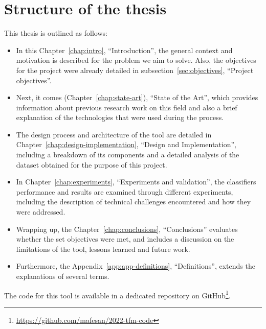 \documentclass[a4paper, 12pt]{book}
\begin{document}
\section{Structure of the thesis}
\label{sec:structure}

This thesis is outlined as follows:

\begin{itemize}
    \item In this Chapter~\ref{chap:intro}, ``Introduction'', the general context and motivation is described for the problem we aim to solve. Also, the objectives for the project were already detailed in subsection~\ref{sec:objectives}, ``Project objectives''. 
    \item Next, it comes (Chapter~\ref{chap:state-art}), ``State of the Art'', which provides information about previous research work on this field and also a brief explanation of the technologies that were used during the process.
    \item The design process and architecture of the tool are detailed in Chapter~\ref{chap:design-implementation}, ``Design and Implementation'', including a breakdown of its components and a detailed analysis of the dataset obtained for the purpose of this project.
    \item In Chapter~\ref{chap:experiments}, ``Experiments and validation'', the classifiers performance and results are examined through different experiments, including the description of technical challenges encountered and how they were addressed.
    \item Wrapping up, the Chapter~\ref{chap:conclusions}, ``Conclusions'' evaluates whether the set objectives were met, and includes a discussion on the limitations of the tool, lessons learned and future work.
    \item Furthermore, the Appendix~\ref{app:app-definitions}, ``Definitions'', extends the explanations of several terms.
\end{itemize}

The code for this tool is available in a dedicated repository on GitHub\footnote{\url{https://github.com/mafesan/2022-tfm-code}}.

\end{document}
